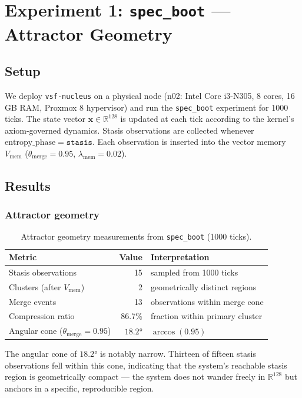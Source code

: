 \documentclass[11pt, a4paper]{article}
\newcommand{\R}{\mathbb{R}}
\newcommand{\sv}{\bm{x}}
\newcommand{\nucleus}{\texttt{vsf-nucleus}}
\begin{document}
\section{Experiment 1: \texttt{spec\_boot} — Attractor Geometry}
\label{sec:specboot}

\subsection{Setup}

We deploy \nucleus{} on a physical node (n02: Intel Core i3-N305, 8 cores,
16\,GB RAM, Proxmox 8 hypervisor) and run the \texttt{spec\_boot} experiment
for 1000 ticks.
The state vector $\sv \in \R^{128}$ is updated at each tick according to
the kernel's axiom-governed dynamics.
Stasis observations are collected whenever $\mathrm{entropy\_phase} =
\texttt{stasis}$.
Each observation is inserted into the vector memory $V_\text{mem}$
($\theta_\text{merge} = 0.95$, $\lambda_\text{mem} = 0.02$).

\subsection{Results}

\subsubsection{Attractor geometry}

\begin{table}[h]
\centering
\begin{tabular}{lrl}
\toprule
Metric & Value & Interpretation \\
\midrule
Stasis observations & 15 & sampled from 1000 ticks \\
Clusters (after $V_\text{mem}$) & 2 & geometrically distinct regions \\
Merge events & 13 & observations within merge cone \\
Compression ratio & 86.7\% & fraction within primary cluster \\
Angular cone ($\theta_\text{merge} = 0.95$) & $18.2°$ & $\arccos(0.95)$ \\
\bottomrule
\end{tabular}
\caption{Attractor geometry measurements from \texttt{spec\_boot} (1000 ticks).}
\label{tab:geometry}
\end{table}

The angular cone of $18.2°$ is notably narrow.
Thirteen of fifteen stasis observations fell within this cone, indicating
that the system's reachable stasis region is geometrically compact — the
system does not wander freely in $\R^{128}$ but anchors in a specific,
reproducible region.
\end{document}
